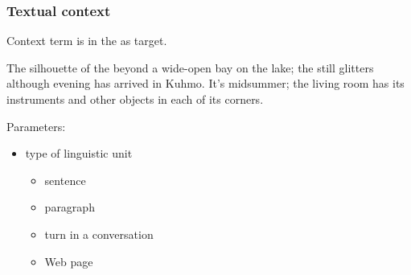 \documentclass[t]{beamer} %
\begin{document}
\begin{frame}
  \frametitle{Textual context}
  
  \begin{center}
    Context term is in the  as target.
  \end{center}

  {\color{secondary}The silhouette of the} 
  {\color{secondary}beyond a wide-open bay on the lake; the}
   {\color{secondary}still glitters although evening has
    arrived in Kuhmo.} It's midsummer; the living room has its
  instruments and other objects in each of its corners.
  
  \gap
  Parameters:
  \begin{itemize}
  \item type of linguistic unit
    \begin{itemize}
    \item sentence
    \item paragraph
    \item turn in a conversation
    \item Web page
    \end{itemize}
  \end{itemize}
\end{frame}
\end{document}
